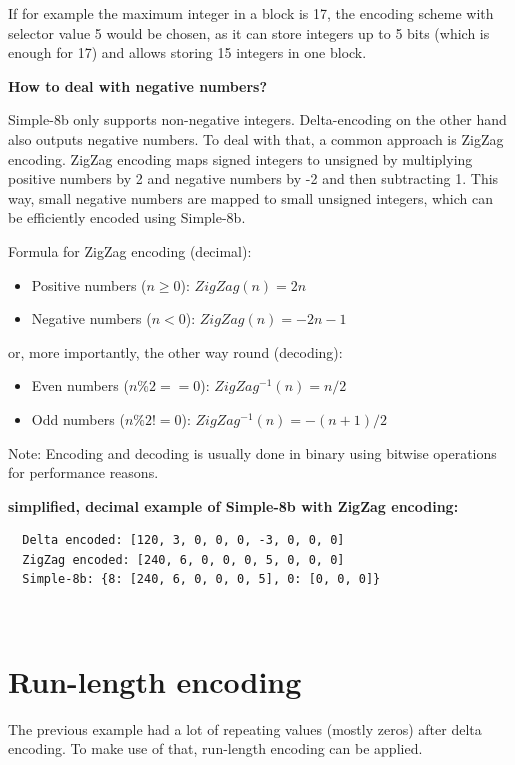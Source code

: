 If for example the maximum integer in a block is 17, the encoding scheme with
selector value 5 would be chosen, as it can store integers up to 5 bits (which
is enough for 17) and allows storing 15 integers in one block.

\textbf{How to deal with negative numbers?}

Simple-8b only supports non-negative integers. Delta-encoding on the other hand
also outputs negative numbers. To deal with that, a common approach is ZigZag
encoding. ZigZag encoding maps signed integers to unsigned by multiplying
positive numbers by 2 and negative numbers by -2 and then subtracting 1. This
way, small negative numbers are mapped to small unsigned integers, which can be
efficiently encoded using Simple-8b.

Formula for ZigZag encoding (decimal):

\begin{itemize}
  \item Positive numbers ($n \geq 0$): $ZigZag(n) = 2n$
  \item Negative numbers ($n < 0$): $ZigZag(n) = -2n - 1$
\end{itemize}

or, more importantly, the other way round (decoding):

\begin{itemize}
  \item Even numbers ($n \% 2 == 0$): $ZigZag^{-1}(n) = n / 2$
  \item Odd numbers ($n \% 2 != 0$): $ZigZag^{-1}(n) = -(n + 1) / 2$
\end{itemize}

Note: Encoding and decoding is usually done in binary using bitwise operations
for performance reasons.

\textbf{simplified, decimal example of Simple-8b with ZigZag encoding:}

\begin{verbatim}
  Delta encoded: [120, 3, 0, 0, 0, -3, 0, 0, 0]
  ZigZag encoded: [240, 6, 0, 0, 0, 5, 0, 0, 0]
  Simple-8b: {8: [240, 6, 0, 0, 0, 5], 0: [0, 0, 0]}
\end{verbatim}

~\cite{ZigZag:01}

\section{Run-length encoding}\label{sec:run-length-encoding}

The previous example had a lot of repeating values (mostly zeros) after delta
encoding. To make use of that, run-length encoding can be applied.

